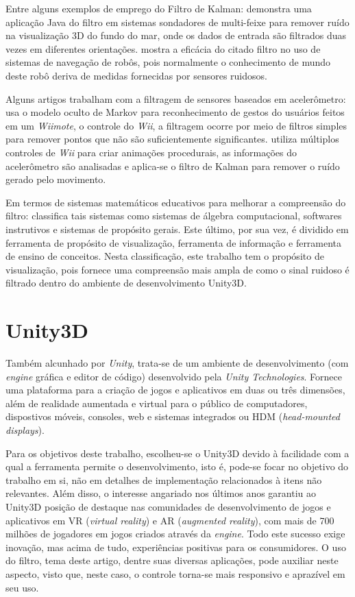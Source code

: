 \documentclass[conference]{IEEEtran}
\begin{document}
Entre alguns exemplos de emprego do Filtro de Kalman: \cite{demkowiczkalman} demonstra uma aplicação Java do filtro em sistemas sondadores de multi-feixe para remover ruído na visualização 3D do fundo do mar, onde os dados de entrada são filtrados duas vezes em diferentes orientações. \cite{choset2005principles} mostra a eficácia do citado filtro no uso de sistemas de navegação de robôs, pois normalmente o conhecimento de mundo deste robô deriva de medidas fornecidas por sensores ruidosos.

Alguns artigos trabalham com a filtragem de sensores baseados em acelerômetro: \cite{schlomer2008gesture} usa o modelo oculto de Markov para reconhecimento de gestos do usuários feitos em um \textit{Wiimote}, o controle do \textit{Wii}, a filtragem ocorre por meio de filtros simples para remover pontos que não são suficientemente significantes. \cite{shiratori2008accelerometer} utiliza múltiplos controles de \textit{Wii} para criar animações procedurais, as informações do acelerômetro são analisadas e aplica-se o filtro de Kalman para remover o ruído  gerado pelo movimento.

Em termos de sistemas matemáticos educativos para melhorar a compreensão do filtro: \cite{guyer2008computer} classifica tais sistemas como sistemas de álgebra computacional, softwares instrutivos e sistemas de propósito gerais. Este último, por sua vez, é dividido em ferramenta de propósito de visualização, ferramenta de informação e ferramenta de ensino de conceitos. Nesta classificação, este trabalho tem o propósito de visualização, pois fornece uma compreensão mais ampla de como o sinal ruidoso é filtrado dentro do ambiente de desenvolvimento Unity3D.

\section{Unity3D} \label{sec:unity3d}
Também alcunhado por \textit{Unity}, trata-se de um ambiente de desenvolvimento (com \textit{engine} gráfica e editor de código) desenvolvido pela \textit{Unity Technologies}. Fornece uma plataforma para a criação de jogos e aplicativos em duas ou três dimensões, além de realidade aumentada e virtual para o público de computadores, dispostivos móveis, consoles, web e sistemas integrados ou HDM (\textit{head-mounted displays}). 

Para os objetivos deste trabalho, escolheu-se o Unity3D devido à facilidade com a qual a ferramenta permite o desenvolvimento, isto é, pode-se focar no objetivo do trabalho em si, não em detalhes de implementação relacionados à itens não relevantes. Além disso, o interesse angariado nos últimos anos garantiu ao Unity3D posição de destaque nas comunidades de desenvolvimento de jogos e aplicativos em VR (\textit{virtual reality}) e AR (\textit{augmented reality}), com mais de 700 milhões de jogadores em jogos criados através da \textit{engine}. Todo este sucesso exige inovação, mas acima de tudo, experiências positivas para os consumidores. O uso do filtro, tema deste artigo, dentre suas diversas aplicações, pode auxiliar neste aspecto, visto que, neste caso, o controle torna-se mais responsivo e aprazível em seu uso. 
\end{document}
